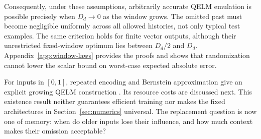 Consequently, under these assumptions, arbitrarily accurate QELM emulation
is possible precisely when $D_d\to0$ as the window grows. The omitted
past must become negligible uniformly across all allowed histories, not
only typical test examples. The same criterion holds for finite vector
outputs, although their unrestricted fixed-window optimum lies between
$D_d/2$ and $D_d$. Appendix~\ref{app:window-laws} provides the proofs and
shows that randomization cannot lower the scalar bound on worst-case
expected absolute error.

For inputs in $[0,1]$, repeated encoding and Bernstein approximation give
an explicit growing QELM construction
\cite{goto2021universal,yu2024nonasymptotic}. Its resource costs are discussed
next. This existence result neither guarantees efficient training nor
makes the fixed architectures in Section~\ref{sec:numerics} universal.
The replacement question is now one of memory: when do older inputs lose
their influence, and how much context makes their omission acceptable?
